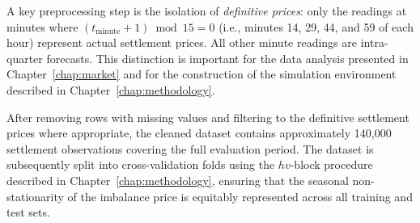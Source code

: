 A key preprocessing step is the isolation of \textit{definitive prices}: only the readings at minutes where $(t_{\text{minute}} + 1) \bmod 15 = 0$ (i.e., minutes 14, 29, 44, and 59 of each hour) represent actual settlement prices. All other minute readings are intra-quarter forecasts. This distinction is important for the data analysis presented in Chapter~\ref{chap:market} and for the construction of the simulation environment described in Chapter~\ref{chap:methodology}.

After removing rows with missing values and filtering to the definitive settlement prices where appropriate, the cleaned dataset contains approximately 140,000 settlement observations covering the full evaluation period. The dataset is subsequently split into cross-validation folds using the $hv$-block procedure described in Chapter~\ref{chap:methodology}, ensuring that the seasonal non-stationarity of the imbalance price is equitably represented across all training and test sets.
